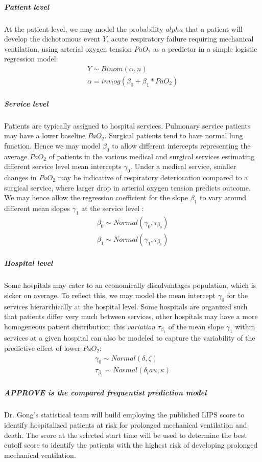 \documentclass[11pt,notitlepage]{article}
\begin{document}
\subparagraph*{Patient level}
At the patient level, we may model the probability $alpha$ that a patient will develop the dichotomous event $Y$, acute respiratory failure requiring mechanical ventilation, using arterial oxygen tension $PaO_{2}$ as a predictor in a simple logistic regression model: 
\begin{align}
Y \sim Binom (\alpha, n) \\
\alpha = inv_log (\beta_{0} +\beta_{1} * PaO_2)
\end{align}

\subparagraph*{Service  level}
Patients are typically assigned to hospital services. Pulmonary service patients may have a lower baseline $PaO_2$. Surgical patients tend to have normal lung function. Hence we may model $\beta_{0}$ to allow different intercepts representing the average $PaO_2$ of patients in the various medical and surgical services estimating different service level mean intercepts $\gamma_0$. Under a medical service, smaller changes in $PaO_2$ may be indicative of respiratory deterioration compared to a surgical service, where larger drop in arterial oxygen tension predicts outcome. We may hence allow the regression coefficient for the slope $\beta_{1}$ to vary around different mean slopes $\gamma_1$ at the service level : 
\begin{align}
 \beta_{0} \sim Normal (\gamma_0 , \tau_{\beta_0}) \\
 \beta_{1} \sim Normal (\gamma_1, \tau_{\beta_1})
\end{align}

\subparagraph*{Hospital level}
Some hospitals may cater to an economically disadvantages population, which is sicker on average. To reflect this, we may  model the mean intercept $\gamma_0$ for the services hierarchically at the hospital level. Some hospitals are organized such that patients differ very much between services, other hospitals may have a more homogeneous patient distribution; this \textit{variation} $\tau_{\beta_1}$ of the mean slope $\gamma_1$ within services at a given hospital can also be modeled to capture the variability of the predictive effect of lower $PaO_2$:
\begin{align}
\gamma_0 \sim Normal (\delta, \zeta) \\
\tau_{\beta_1} \sim Normal(\delta_tau, \kappa) 
\end{align}

\subparagraph*{APPROVE is the compared frequentist prediction model}
Dr. Gong's statistical team will build employing the published LIPS score \cite{Herridge_12594312} to identify hospitalized patients at risk for prolonged mechanical ventilation and death. The score at the selected start time will be used to determine the best cutoff score to identify the patients with the highest risk of developing prolonged mechanical ventilation.
\end{document}
